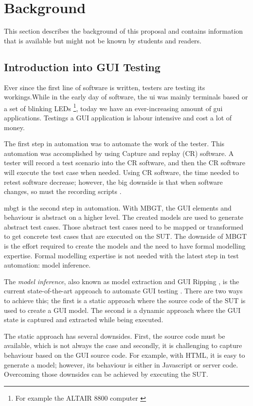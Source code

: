 \section{Background} \label{background}
This section describes the background of this proposal and contains information that is available but might not be known by students and readers. 

\subsection{Introduction into GUI Testing}
Ever since the first line of software is written, testers are testing its workings.While in the early day of software, the \acrfull{ui} was mainly terminals based or a set of blinking LEDs \cite{altair8800} \footnote{For example the ALTAIR 8800 computer \cite{altair8800}}, today we have an ever-increasing amount of \acrfull{gui} applications. Testings a GUI application is labour intensive and cost a lot of money. \cite{gui-history}

The first step in automation was to automate the work of the tester. This automation was accomplished by using Capture and replay (CR) software. A tester will record a test scenario into the CR software, and then the CR software will execute the test case when needed. Using CR software, the time needed to retest software decrease; however, the big downside is that when software changes, so must the recording scripts \cite{gui-history}.

\acrfull{mbgt} is the second step in automation. With MBGT, the GUI elements and behaviour is abstract on a higher level. The created models are used to generate abstract test cases. Those abstract test cases need to be mapped or transformed to get concrete test cases that are executed on the SUT. The downside of MBGT is the effort required to create the models and the need to have formal modelling expertise. Formal modelling expertise is not needed with the latest step in test automation: model inference. 

The \emph{model inference}, also known as model extraction and GUI Ripping \cite{gui-ripping}, is the current state-of-the-art approach to automate GUI testing \cite{gui-history}. There are two ways to achieve this; the first is a static approach where the source code of the SUT is used to create a GUI model. The second is a dynamic approach where the GUI state is captured and extracted while being executed. 

The static approach has several downsides. First, the source code must be available, which is not always the case and secondly, it is challenging to capture behaviour based on the GUI source code. For example, with HTML, it is easy to generate a model; however, its behaviour is either in Javascript or server code. Overcoming those downsides can be achieved by executing the SUT. 

